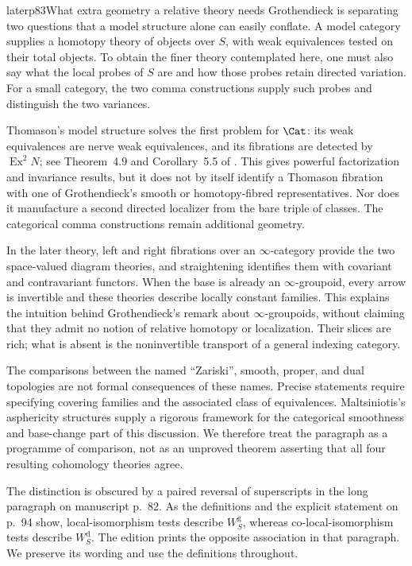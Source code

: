 \begin{dcomment}{later}{p83}{What extra geometry a relative theory needs}
Grothendieck is separating two questions that a model structure alone can easily conflate. A model category supplies a homotopy theory of objects over $S$, with weak equivalences tested on their total objects. To obtain the finer theory contemplated here, one must also say what the local probes of $S$ are and how those probes retain directed variation. For a small category, the two comma constructions supply such probes and distinguish the two variances.

Thomason's model structure solves the first problem for $\Cat$: its weak equivalences are nerve weak equivalences, and its fibrations are detected by $\operatorname{Ex}^2N$; see Theorem~4.9 and Corollary~5.5 of \citet{Thomason1980}. This gives powerful factorization and invariance results, but it does not by itself identify a Thomason fibration with one of Grothendieck's smooth or homotopy-fibred representatives. Nor does it manufacture a second directed localizer from the bare triple of classes. The categorical comma constructions remain additional geometry.

In the later theory, left and right fibrations over an $\infty$-category provide the two space-valued diagram theories, and straightening identifies them with covariant and contravariant functors. When the base is already an $\infty$-groupoid, every arrow is invertible and these theories describe locally constant families. This explains the intuition behind Grothendieck's remark about $\infty$-groupoids, without claiming that they admit no notion of relative homotopy or localization. Their slices are rich; what is absent is the noninvertible transport of a general indexing category.

The comparisons between the named ``Zariski'', smooth, proper, and dual topologies are not formal consequences of these names. Precise statements require specifying covering families and the associated class of equivalences. Maltsiniotis's asphericity structures supply a rigorous framework for the categorical smoothness and base-change part of this discussion. We therefore treat the paragraph as a programme of comparison, not as an unproved theorem asserting that all four resulting cohomology theories agree.

The distinction is obscured by a paired reversal of superscripts in the long
paragraph on manuscript p.~82. As the definitions and the explicit statement
on p.~94 show, local-isomorphism tests describe $W_S^{\mathrm g}$, whereas
co-local-isomorphism tests describe $W_S^{\mathrm d}$. The edition prints the
opposite association in that paragraph. We preserve its wording and use the
definitions throughout.

\end{dcomment}

